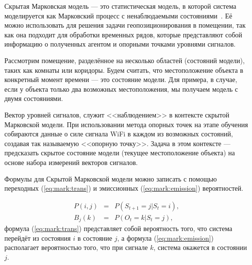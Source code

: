 
Скрытая Марковская модель --- это статистическая модель, в которой система моделируется как Марковский процесс с ненаблюдаемыми состояниями~\cite{mor2021systematic}. Её можно использовать для решения задачи геопозиционирования в помещении, так как она подходит для обработки временных рядов, которые представляют собой информацию о полученных агентом и опорными точками уровнями сигналов.

Рассмотрим помещение, разделённое на несколько областей (состояний модели), таких как комнаты или коридоры. Будем считать, что местоположение объекта в конкретный момент времени --- это состояние модели. Для примера, в случае, если у объекта только два возможных местоположения, мы получаем модель с двумя состояниями.

Вектор уровней сигналов, служит <<наблюдением>> в контексте скрытой Марковской модели. При использовании метода опорных точек на этапе обучения собираются данные о силе сигнала WiFi в каждом из возможных состояний, создавая так называемую <<опорную точку>>. Задача в этом контексте --- предсказать скрытое состояние модели (текущее местоположение объекта) на основе набора измерений векторов сигналов.

Формулы для Скрытой Марковской модели можно записать с помощью переходных (\ref{eq:mark:trans}) и эмиссионных (\ref{eq:mark:emission}) вероятностей.

\begin{eqnarray}
    P(i, j) &=& P(S_{t+1}=j|S_t=i), \label{eq:mark:trans} \\
    B_j(k) &=& P(O_t=k|S_t=j), \label{eq:mark:emission}
\end{eqnarray}
формула (\ref{eq:mark:trans}) представляет собой вероятность того, что система перейдёт из состояния $i$ в состояние $j$, а формула (\ref{eq:mark:emission}) располагает вероятностью того, что при сигнале $k$, система окажется в состоянии $j$.

